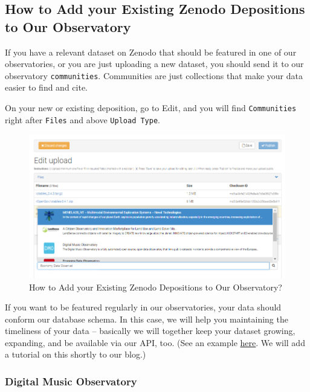 \documentclass[
  a4paper,
  openany, a4paper, oneside]{book}
\begin{document}
\hypertarget{how-to-add-your-existing-zenodo-depositions-to-our-observatory}{%
\subsection{How to Add your Existing Zenodo Depositions to Our Observatory}\label{how-to-add-your-existing-zenodo-depositions-to-our-observatory}}

If you have a relevant dataset on Zenodo that should be featured in one of our observatories, or you are just uploading a new dataset, you should send it to our observatory \texttt{communities}. Communities are just collections that make your data easier to find and cite.

On your new or existing deposition, go to Edit, and you will find \texttt{Communities} right after \texttt{Files} and above \texttt{Upload\ Type}.

\begin{figure}

{\centering \includegraphics[width=0.85\linewidth]{plots/screenshots/zenodo_how_to_add} 

}

\caption{How to Add your Existing Zenodo Depositions to Our Observatory?}\label{fig:how-to-add-zenodo}
\end{figure}

If you want to be featured regularly in our observatories, your data should conform our database schema. In this case, we will help you maintaining the timeliness of your data -- basically we will together keep your dataset growing, expanding, and be available via our API, too. (See an example \href{http://34.226.91.55}{here}. We will add a tutorial on this shortly to our blog.)

\hypertarget{digital-music-observatory-1}{%
\subsubsection{Digital Music Observatory}\label{digital-music-observatory-1}}
\end{document}
